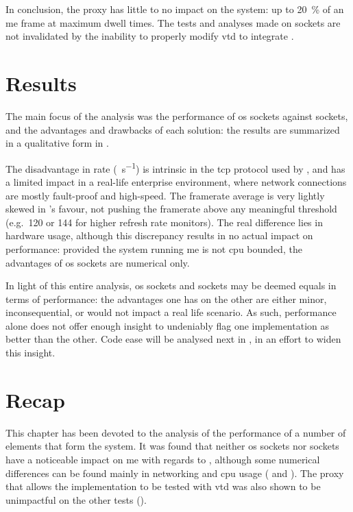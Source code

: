 In conclusion, the \gls{proxy} has little to no impact on the system: up to \SI{20}{\percent} of an \gls{me} frame at maximum dwell times. The tests and analyses made on  sockets are not invalidated by the inability to properly modify \gls{vtd} to integrate .

\section{Results}\label{sc:performance:results}

The main focus of the analysis was the performance of \gls{os} sockets against  sockets, and the advantages and drawbacks of each solution: the results are summarized in a qualitative form in .



The disadvantage in rate (\si{\packets\per\second}) is intrinsic in the \gls{tcp} protocol used by , and has a limited impact in a real-life enterprise environment, where network connections are mostly fault-proof and high-speed. The \gls{framerate} average is very lightly skewed in 's favour, not pushing the \gls{framerate} above any meaningful threshold (e.g.\ \SI{120}{\fps} or \SI{144}{\fps} for higher refresh rate monitors). The real difference lies in hardware usage, although this discrepancy results in no actual impact on performance: provided the system running \gls{me} is not \gls{cpu} bounded, the advantages of \gls{os} sockets are numerical only.

In light of this entire analysis, \gls{os} sockets and  sockets may be deemed equals in terms of performance: the advantages one has on the other are either minor, inconsequential, or would not impact a real life scenario. As such, performance alone does not offer enough insight to undeniably flag one implementation as better than the other. Code ease will be analysed next in , in an effort to widen this insight.

\section{Recap}\label{sc:performance:recap}

This chapter has been devoted to the analysis of the performance of a number of elements that form the system. It was found that neither \gls{os} sockets nor  sockets have a noticeable impact on \gls{me} with regards to , although some numerical differences can be found mainly in networking and \gls{cpu} usage ( and ). The proxy that allows the  implementation to be tested with \gls{vtd} was also shown to be unimpactful on the other tests ().
